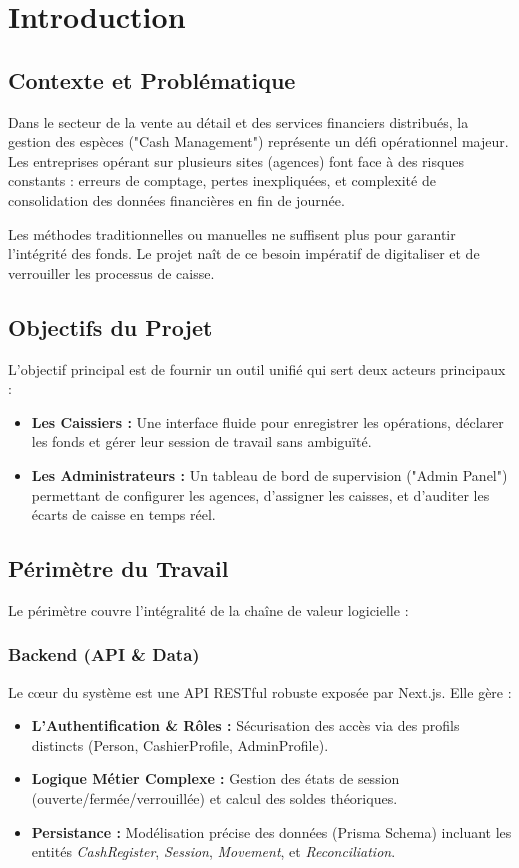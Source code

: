 \chapter{Introduction}

\section{Contexte et Problématique}
Dans le secteur de la vente au détail et des services financiers distribués, la gestion des espèces ("Cash Management") représente un défi opérationnel majeur. Les entreprises opérant sur plusieurs sites (agences) font face à des risques constants : erreurs de comptage, pertes inexpliquées, et complexité de consolidation des données financières en fin de journée.

Les méthodes traditionnelles ou manuelles ne suffisent plus pour garantir l'intégrité des fonds. Le projet \textbf{\projectName} naît de ce besoin impératif de digitaliser et de verrouiller les processus de caisse.

\section{Objectifs du Projet}
L'objectif principal est de fournir un outil unifié qui sert deux acteurs principaux :
\begin{itemize}
    \item \textbf{Les Caissiers :} Une interface fluide pour enregistrer les opérations, déclarer les fonds et gérer leur session de travail sans ambiguïté.
    \item \textbf{Les Administrateurs :} Un tableau de bord de supervision ("Admin Panel") permettant de configurer les agences, d'assigner les caisses, et d'auditer les écarts de caisse en temps réel.
\end{itemize}

\section{Périmètre du Travail}
Le périmètre couvre l'intégralité de la chaîne de valeur logicielle :

\subsection{Backend (API & Data)}
Le cœur du système est une API RESTful robuste exposée par Next.js. Elle gère :
\begin{itemize}
    \item \textbf{L'Authentification & Rôles :} Sécurisation des accès via des profils distincts (Person, CashierProfile, AdminProfile).
    \item \textbf{Logique Métier Complexe :} Gestion des états de session (ouverte/fermée/verrouillée) et calcul des soldes théoriques.
    \item \textbf{Persistance :} Modélisation précise des données (Prisma Schema) incluant les entités \textit{CashRegister}, \textit{Session}, \textit{Movement}, et \textit{Reconciliation}.
\end{itemize}

